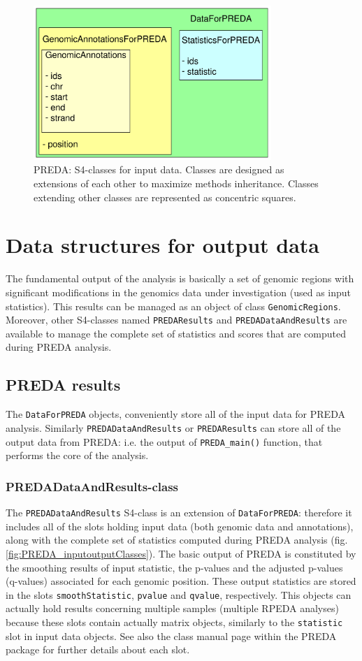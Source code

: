 \documentclass[a4paper,10pt]{article}
\begin{document}
\begin{figure}[htbp]
 \centering
 \includegraphics[width=9cm]{images/PREDA_inputClasses.png}
  \caption{PREDA: S4-classes for input data. Classes are designed as extensions of each other to maximize methods inheritance. Classes extending other classes are represented as concentric squares.}
 \label{fig:PREDA_inputClasses}
\end{figure}


\section{Data structures for output data}
The fundamental output of the analysis is basically a set of genomic regions with significant modifications in the genomics data under investigation (used as input statistics). This results can be managed as an object of class \texttt{GenomicRegions}. Moreover, other S4-classes named \texttt{PREDAResults} and \texttt{PREDADataAndResults} are available to manage the complete set of statistics and scores that are computed during PREDA analysis.


\subsection{PREDA results}
The \texttt{DataForPREDA} objects, conveniently store all of the input data for PREDA analysis. Similarly \texttt{PREDADataAndResults} or \texttt{PREDAResults} can store all of the output data from PREDA: i.e. the output of \texttt{PREDA\_main()} function, that performs the core of the analysis.


\subsubsection{PREDADataAndResults-class}
The \texttt{PREDADataAndResults} S4-class is an extension of \texttt{DataForPREDA}: therefore it includes all of the slots holding input data (both genomic data and annotations), along with the complete set of statistics computed during PREDA analysis (fig. \ref{fig:PREDA_inputoutputClasses}). The basic output of PREDA is constituted by the smoothing results of input statistic, the p-values and the adjusted p-values (q-values) associated for each genomic position. These output statistics are stored in the slots \texttt{smoothStatistic}, \texttt{pvalue} and \texttt{qvalue}, respectively. This objects can actually hold results concerning multiple samples (multiple RPEDA analyses) because these slots contain actually matrix objects, similarly to the \texttt{statistic} slot in input data objects. See also the class manual page within the PREDA package for further details about each slot.
\end{document}
